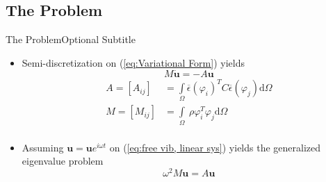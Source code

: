 \documentclass{beamer}[10pt]
\begin{document}
\subsection{The Problem}

\begin{frame}{The Problem}{Optional Subtitle}


  \begin{itemize}
  \item {
    Semi-discretization on (\ref{eq:Variational Form}) yields
    \begin{equation}
    M\ddot{\boldsymbol{u}} = -A\boldsymbol{u}
    \label{eq:free vib, linear sys}
    \end{equation}
    \footnotesize
    \begin{align*}
    A  = \left[ A_{ij} \right] & = \int\limits_{\Omega} \overline{\epsilon}\left( \varphi_i \right)^T C\overline{\epsilon}\left( \varphi_j \right) \mathrm{d} \Omega \\
    M  = \left[ M_{ij} \right] &= \int\limits_{\Omega} \ \rho \varphi_{i}^T \varphi_j \mathrm{d} \Omega \\ 
    \end{align*}
    \normalsize
  }
  \item {
	Assuming $\boldsymbol{u} = \boldsymbol{u}e^{i\omega t}$ on (\ref{eq:free vib, linear sys}) yields the generalized eigenvalue problem
	\begin{equation}
	\omega^2 M\boldsymbol{u} = A\boldsymbol{u}
	\label{eq:eigenvalue problem}
	\end{equation}	  
  }
  \end{itemize}
\end{frame}
\end{document}
